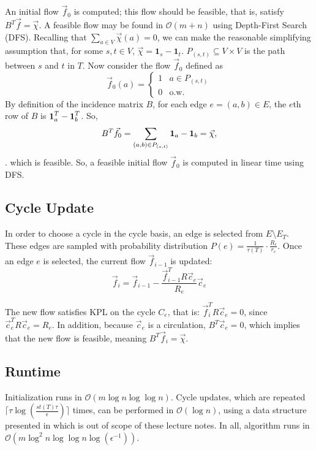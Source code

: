 An initial flow $\vec f_0$ is computed; this flow should be feasible, that is, satisfy $B^T\vec f = \vec \chi$. A feasible flow may be found in $\mathcal O(m + n)$ using Depth-First Search (DFS). Recalling that $\sum_{a \in V} \vec\chi (a) = 0$, we can make the reasonable simplifying assumption that, for some $s, t \in V$, $\vec \chi =  \textbf{1}_s - \textbf{1}_t$. $P_{(s,t)} \subseteq V \times V$ is the path between $s$ and $t$ in $T$. Now consider the flow $\vec f_0$ defined as $$ \vec f_0(a) = \begin{cases}
    1 & a \in P_{(s,t)} \\ 0 & \text{o.w.}
\end{cases}$$
By definition of the incidence matrix $B$, for each edge $e = (a,b) \in E$, the $e$th row of $B$ is $\textbf 1_{a}^T - \textbf 1_{b}^T$. So,  $$B^T \vec f_0 = \sum_{(a,b) \in P_{(s,t)}} \textbf 1_{a} - \textbf 1_{b} = \vec \chi,$$. which is feasible. So, a feasible initial flow $\vec f_0$ is computed in linear time using DFS. 

\subsection{Cycle Update}
\label{algorith:cycle-update}
In order to choose a cycle in the cycle basis, an edge is selected from $E \setminus E_T$. These edges are sampled with probability distribution $P(e) = \frac{1}{\tau(T)} \cdot \frac{R_e}{r_e}$. Once an edge $e$ is selected, the current flow $\vec f_{i-1}$ is updated:
$$\vec f_i = \vec f_{i-1} - \frac{\vec f_{i-1}^TR\vec c_e}{R_e}\vec c_e$$

The new flow satisfies KPL on the cycle $C_e$, that is: $\vec f_i^T R \vec c_e = 0$, since $\vec c_e^TR\vec c_e = R_e$. In addition, because $\vec c_e$ is a circulation, $B^T \vec c_e = 0$, which implies that the new flow is feasible, meaning $B^T \vec f_i = \vec \chi$. 

\subsection{Runtime}

Initialization runs in $\mathcal O(m \log n \log \log n)$. Cycle updates, which are repeated $\lceil \tau \log (\frac{st(T) \tau}{\epsilon}) \rceil$ times, can be performed in $\mathcal O(\log n)$, using a data structure presented in \cite{Kel13} which is out of scope of these lecture notes. In all, algorithm runs in $\mathcal O (m \log^2 n \log{ \log n \log{(\epsilon^{{-1}})}})$. 

